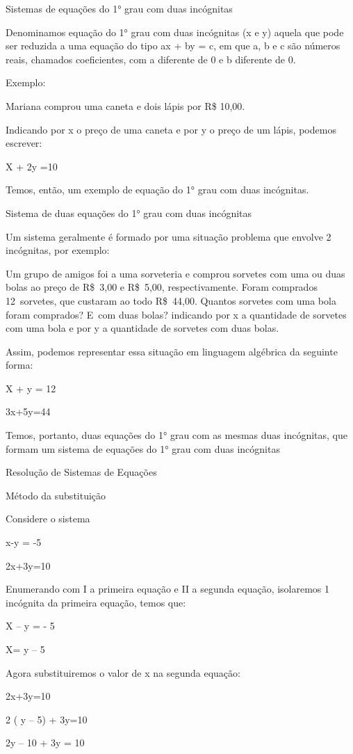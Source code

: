 Sistemas de equações do 1° grau com duas incógnitas

Denominamos equação do 1° grau com duas incógnitas (x e y) aquela que
pode ser reduzida a uma equação do tipo ax + by = c, em que a, b e c são
números reais, chamados coeficientes, com a diferente de 0 e b diferente
de 0.

Exemplo:

Mariana comprou uma caneta e dois lápis por R\$ 10,00.

Indicando por x o preço de uma caneta e por y o preço de um lápis,
podemos escrever:

X + 2y =10

Temos, então, um exemplo de equação do 1° grau com duas incógnitas.

Sistema de duas equações do 1° grau com duas incógnitas

Um sistema geralmente é formado por uma situação problema que envolve 2
incógnitas, por exemplo:

Um grupo de amigos foi a uma sorveteria e comprou sorvetes com uma ou
duas bolas ao preço de R\$~3,00 e R\$~5,00, respectivamente. Foram
comprados 12~sorvetes, que custaram ao todo R\$~44,00. Quantos sorvetes
com uma bola foram comprados? E~com duas bolas? indicando por x a
quantidade de sorvetes com uma bola e por y a quantidade de sorvetes com
duas bolas.

Assim, podemos representar essa situação em linguagem algébrica da
seguinte forma:

X + y = 12

3x+5y=44

Temos, portanto, duas equações do 1° grau com as mesmas duas incógnitas,
que formam um sistema de equações do 1° grau com duas incógnitas

Resolução de Sistemas de Equações

Método da substituição

Considere o sistema

x-y = -5

2x+3y=10

Enumerando com I a primeira equação e II a segunda equação, isolaremos 1
incógnita da primeira equação, temos que:

X -- y = - 5

X= y -- 5

Agora substituiremos o valor de x na segunda equação:

2x+3y=10

2 ( y -- 5) + 3y=10

2y -- 10 + 3y = 10

